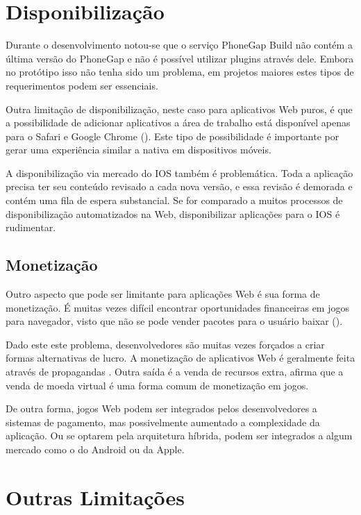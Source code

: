 \section{Disponibilização}

Durante o desenvolvimento notou-se que o serviço PhoneGap Build não
contém a última versão do PhoneGap e não é possível utilizar
plugins através dele. Embora no protótipo isso não tenha sido um
problema, em projetos maiores estes tipos de requerimentos podem ser
essenciais.

Outra limitação de disponibilização, neste caso para aplicativos
Web puros, é que a possibilidade de adicionar aplicativos a área
de trabalho está disponível apenas para o Safari e Google Chrome
(). Este tipo de possibilidade é importante por
gerar uma experiência similar a nativa em dispositivos móveis.

A disponibilização via mercado do IOS também é problemática. Toda
a aplicação precisa ter seu conteúdo revisado a cada nova versão,
e essa revisão é demorada e contém uma fila de espera substancial.
Se for comparado a muitos processos de disponibilização automatizados na
Web, disponibilizar aplicações para o IOS é rudimentar.

\subsection{Monetização}

Outro aspecto que pode ser limitante para aplicações Web é
sua forma de monetização. É muitas vezes difícil encontrar
oportunidades financeiras em jogos para navegador, visto que não
se pode vender pacotes para o usuário baixar \autocite[p. 44]{gameCommunities}
().

Dado este este problema, desenvolvedores são muitas vezes forçados
a criar formas alternativas de lucro. A monetização de aplicativos
Web é geralmente feita através de propagandas \autocite[p.
44]{gameCommunities}. Outra saída é a venda de recursos extra,
\citet[p. 44]{gameCommunities} afirma que a venda de moeda virtual é
uma forma comum de monetização em jogos.

De outra forma, jogos Web podem ser integrados pelos desenvolvedores
a sistemas de pagamento, mas possivelmente aumentado a complexidade
da aplicação. Ou se optarem pela arquitetura híbrida, podem ser
integrados a algum mercado como o do Android ou da Apple.

\section{Outras Limitações}

